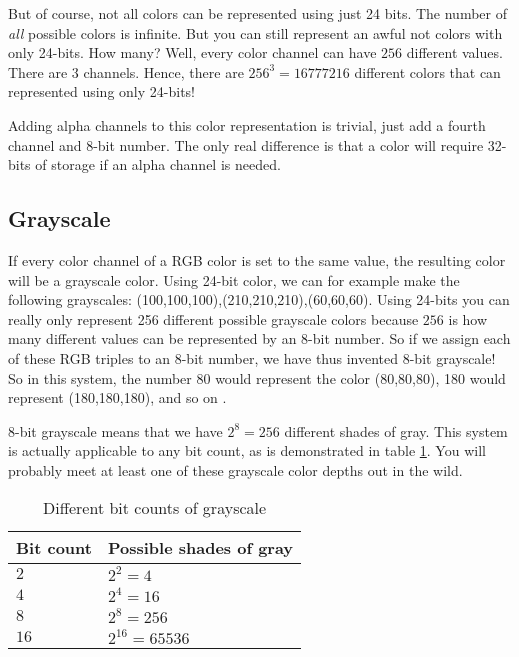 \begin{refsection}
  But of course, not all colors can be represented using just
  24 bits. The number of \textit{all} possible colors is infinite. But you can still
  represent an awful not colors with only 24-bits. How many? Well, every
  color channel can have $256$ different values. There are $3$
  channels. Hence, there are $256^3 = 16777216$ different colors that
  can represented using only 24-bits!

  \newcommand{\rgbaquad}[4]{
    \mbox{(\textcolor{red}{#1},\textcolor{green}{#2},\textcolor{blue}{#3},\textcolor{gray}{#4})}}

  Adding alpha channels to this color representation is trivial, just
  add a fourth channel and 8-bit number. The only real
  difference is that a color will require 32-bits of storage if an
  alpha channel is needed.

  \subsection{Grayscale}
  \label{sec:other-colors-depths}

  \newcommand{\selfrgbtrip}[3]{\mbox{\textcolor[RGB]{#1,#2,#3}{(#1,#2,#3)}}}
  \newcommand{\selfrgbtripgray}[1]{\selfrgbtrip{#1}{#1}{#1}}

  If every color channel of a RGB color is set to the same value, the
  resulting color will be a grayscale color. Using 24-bit color, we can for example make the following
  grayscales:
  \selfrgbtripgray{100},\selfrgbtripgray{210},\selfrgbtripgray{60}. Using
  24-bits you can really only represent 256 different possible
  grayscale colors because $256$ is how many different values can be
  represented by an 8-bit number. So if we assign each of these RGB
  triples to an 8-bit number, we have thus invented 8-bit
  grayscale! So in this system, the number 80
  would represent the color \selfrgbtripgray{80}, 180 would represent
  \selfrgbtripgray{180}, and so on \cite{puglia00:_handbook_dig_proj}.

  8-bit grayscale means that we have $2^8=256$ different shades of
  gray. This system is actually applicable to any bit count, as is
  demonstrated in table \ref{tab:grayscale}. You will probably meet at least one of
  these grayscale color depths out in the wild.

  \begin{table}
    \centering
    \begin{tabular}{ll}
      \toprule
      Bit count & Possible shades of gray \\
      \midrule
      $2$ & $2^2 = 4$ \\
      $4$ & $2^4 = 16$ \\
      $8$ & $2^8 = 256$ \\
      $16$ & $2^{16} = 65536$ \\
      \bottomrule
    \end{tabular}
    \caption{Different bit counts of grayscale}
    \label{tab:grayscale}
  \end{table}

  \printbibliography[heading=subbibliography]
\end{refsection}